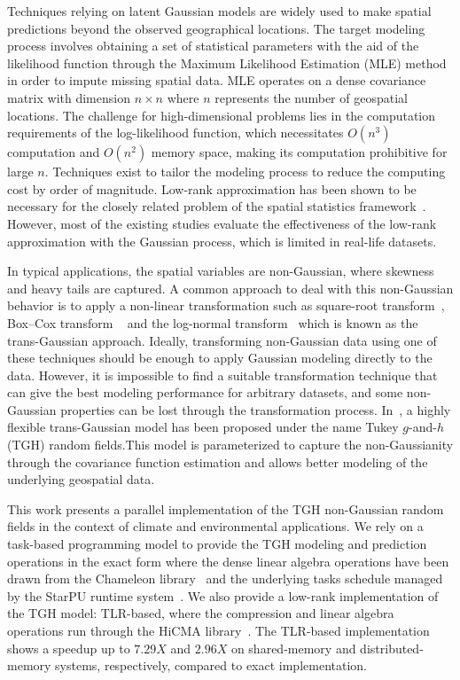 \documentclass[conference]{IEEEtran}
\begin{document}
Techniques relying on latent Gaussian models are widely used to make spatial predictions beyond the observed geographical locations. The target modeling
process involves obtaining a set of statistical parameters
with the aid of the likelihood function through the Maximum Likelihood Estimation (MLE) method in order to impute missing spatial data.  MLE 
operates on a dense covariance matrix with dimension $n \times n$ where $n$ represents the number of geospatial locations. The challenge for high-dimensional problems lies in the
computation requirements of the log-likelihood function, which necessitates $O(n^3)$ computation and $O(n^2)$ memory space, making its computation prohibitive for large $n$. Techniques exist to tailor the modeling process to reduce the computing cost by order of magnitude. Low-rank approximation has been shown to be necessary for the
closely related problem of the spatial statistics framework~\cite{cressie2008fixed, eidsvik2012approximate, stein2013stochastic, abdulah2018parallel}. However, most of the existing  studies evaluate the effectiveness of the low-rank approximation with the Gaussian process, which is limited in real-life datasets.

In typical applications, the spatial variables are non-Gaussian, where skewness
and heavy tails are captured. A common approach 
to deal with this non-Gaussian behavior is to apply a  non-linear transformation such as 
square-root transform~\cite{berrocal2010bivariate,yao2015fault,yan2019non}, Box–Cox transform ~\cite{de1997bayesian} and the log-normal 
transform~\cite{rios2018learning} which is known as the trans-Gaussian approach. Ideally, transforming non-Gaussian 
data using one of these techniques should be 
enough to apply Gaussian modeling directly to the data. However, it is impossible to find a suitable transformation technique 
that can give the best modeling performance for arbitrary datasets, and some non-Gaussian properties can be lost through the transformation 
process. In~\cite{xu2017tukey}, a highly flexible trans-Gaussian model has been proposed under the name Tukey $g$-and-$h$ (TGH) random
fields.This model is parameterized to capture the non-Gaussianity  through the covariance function estimation and allows better modeling of the underlying geospatial data.

This work presents a parallel implementation of the 
TGH non-Gaussian random fields in the context of climate and environmental applications.
We rely on a task-based programming model to provide
the TGH modeling and prediction operations in the exact form where the dense linear algebra operations have been drawn from 
the Chameleon library~\cite{agullo2017achieving}
and the underlying tasks schedule managed by the StarPU 
runtime system~\cite{augonnet2011starpu}. We also provide a low-rank implementation 
of the TGH model: TLR-based, where the compression and linear algebra operations run through the HiCMA library~\cite{hicma-soft}.
The TLR-based implementation shows a 
speedup up to $7.29X$ and $2.96X$ on shared-memory and distributed-memory systems, respectively, compared
to exact implementation.
\end{document}
